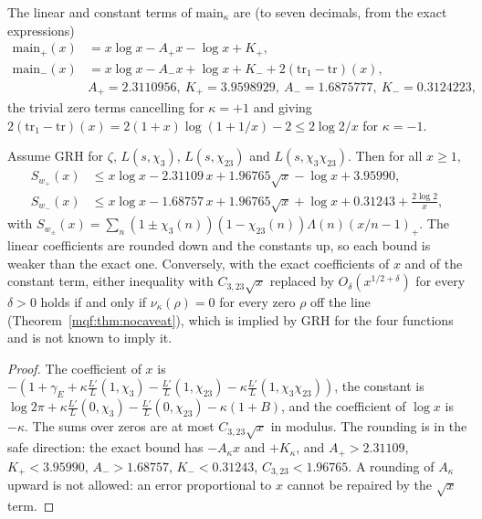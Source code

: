 The linear and constant terms of $\mathrm{main}_\kappa$ are (to seven decimals, from the exact expressions)
\[
\begin{aligned}
\mathrm{main}_+(x)&=x\log x-A_+x-\log x+K_+,\\
\mathrm{main}_-(x)&=x\log x-A_-x+\log x+K_-+2(\mathrm{tr}_1-\mathrm{tr})(x),\\
{}&A_+=2.3110956,\ K_+=3.9598929,\ A_-=1.6875777,\ K_-=0.3124223,
\end{aligned}
\]
the trivial zero terms cancelling for $\kappa=+1$ and giving $2(\mathrm{tr}_1-\mathrm{tr})(x)=2(1+x)\log(1+1/x)-2\le2\log2/x$ for $\kappa=-1$.

\begin{corollary}\label{mqf:cor:explicit}
Assume GRH for $\zeta$, $L(s,\chi_3)$, $L(s,\chi_{23})$ and $L(s,\chi_3\chi_{23})$. Then for all $x\ge1$,
\[
\begin{aligned}
S_{w_+}(x)&\le x\log x-2.31109\,x+1.96765\sqrt x-\log x+3.95990,\\
S_{w_-}(x)&\le x\log x-1.68757\,x+1.96765\sqrt x+\log x+0.31243+\frac{2\log2}x,
\end{aligned}
\]
with $S_{w_\pm}(x)=\sum_n(1\pm\chi_3(n))(1-\chi_{23}(n))\Lambda(n)(x/n-1)_+$. The linear coefficients are rounded down and the constants up, so each bound is weaker than the exact one. Conversely, with the exact coefficients of $x$ and of the constant term, either inequality with $C_{3,23}\sqrt x$ replaced by $O_\delta(x^{1/2+\delta})$ for every $\delta>0$ holds if and only if $\nu_\kappa(\rho)=0$ for every zero $\rho$ off the line (Theorem~\ref{mqf:thm:nocaveat}), which is implied by GRH for the four functions and is not known to imply it.
\end{corollary}

\begin{proof}
The coefficient of $x$ is $-(1+\gamma_E+\kappa\frac{L'}L(1,\chi_3)-\frac{L'}L(1,\chi_{23})-\kappa\frac{L'}L(1,\chi_3\chi_{23}))$, the constant is $\log2\pi+\kappa\frac{L'}L(0,\chi_3)-\frac{L'}L(0,\chi_{23})-\kappa(1+B)$, and the coefficient of $\log x$ is $-\kappa$. The sums over zeros are at most $C_{3,23}\sqrt x$ in modulus. The rounding is in the safe direction: the exact bound has $-A_\kappa x$ and $+K_\kappa$, and $A_+>2.31109$, $K_+<3.95990$, $A_->1.68757$, $K_-<0.31243$, $C_{3,23}<1.96765$. A rounding of $A_\kappa$ upward is not allowed: an error proportional to $x$ cannot be repaired by the $\sqrt x$ term.
\end{proof}

